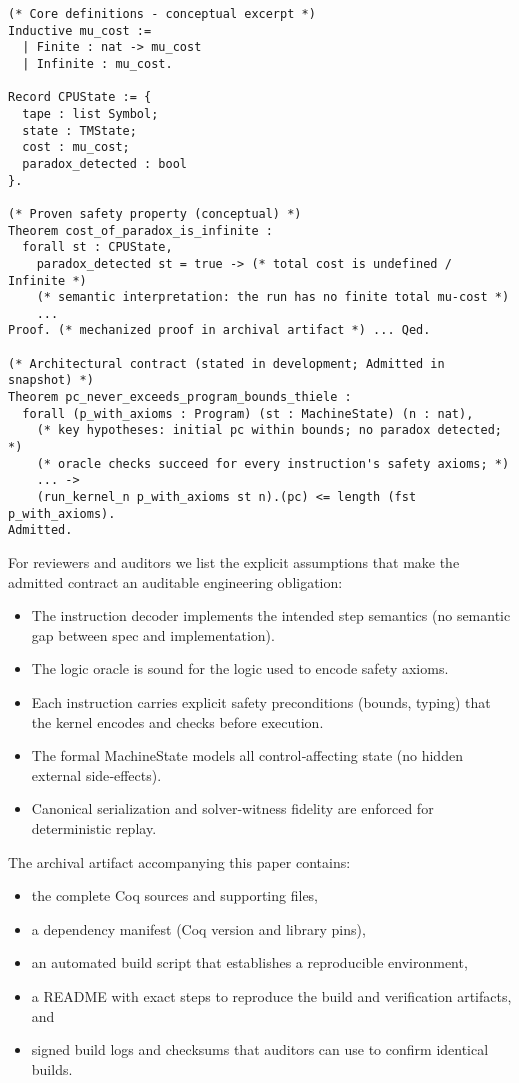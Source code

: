 \documentclass[11pt]{article}
\begin{document}
\begin{verbatim}
(* Core definitions - conceptual excerpt *)
Inductive mu_cost :=
  | Finite : nat -> mu_cost
  | Infinite : mu_cost.

Record CPUState := {
  tape : list Symbol;
  state : TMState;
  cost : mu_cost;
  paradox_detected : bool
}.

(* Proven safety property (conceptual) *)
Theorem cost_of_paradox_is_infinite :
  forall st : CPUState,
    paradox_detected st = true -> (* total cost is undefined / Infinite *)
    (* semantic interpretation: the run has no finite total mu-cost *)
    ...
Proof. (* mechanized proof in archival artifact *) ... Qed.

(* Architectural contract (stated in development; Admitted in snapshot) *)
Theorem pc_never_exceeds_program_bounds_thiele :
  forall (p_with_axioms : Program) (st : MachineState) (n : nat),
    (* key hypotheses: initial pc within bounds; no paradox detected; *)
    (* oracle checks succeed for every instruction's safety axioms; *)
    ... ->
    (run_kernel_n p_with_axioms st n).(pc) <= length (fst p_with_axioms).
Admitted.
\end{verbatim}

For reviewers and auditors we list the explicit assumptions that make the admitted contract an auditable engineering obligation:
\begin{itemize}
  \item The instruction decoder implements the intended step semantics (no semantic gap between spec and implementation).
  \item The logic oracle is sound for the logic used to encode safety axioms.
  \item Each instruction carries explicit safety preconditions (bounds, typing) that the kernel encodes and checks before execution.
  \item The formal MachineState models all control‑affecting state (no hidden external side‑effects).
  \item Canonical serialization and solver‑witness fidelity are enforced for deterministic replay.
\end{itemize}

The archival artifact accompanying this paper contains:
\begin{itemize}
  \item the complete Coq sources and supporting files,
  \item a dependency manifest (Coq version and library pins),
  \item an automated build script that establishes a reproducible environment,
  \item a README with exact steps to reproduce the build and verification artifacts, and
  \item signed build logs and checksums that auditors can use to confirm identical builds.
\end{itemize}
\end{document}
